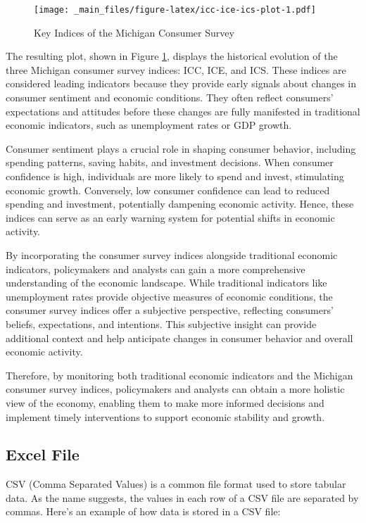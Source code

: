 \documentclass[
]{book}
\begin{document}
\begin{figure}
\centering
\texttt{[image: \_main\_files/figure-latex/icc-ice-ics-plot-1.pdf]}
\caption{\label{fig:icc-ice-ics-plot}Key Indices of the Michigan Consumer Survey}
\end{figure}

The resulting plot, shown in Figure \ref{fig:icc-ice-ics-plot}, displays the historical evolution of the three Michigan consumer survey indices: ICC, ICE, and ICS. These indices are considered leading indicators because they provide early signals about changes in consumer sentiment and economic conditions. They often reflect consumers' expectations and attitudes before these changes are fully manifested in traditional economic indicators, such as unemployment rates or GDP growth.

Consumer sentiment plays a crucial role in shaping consumer behavior, including spending patterns, saving habits, and investment decisions. When consumer confidence is high, individuals are more likely to spend and invest, stimulating economic growth. Conversely, low consumer confidence can lead to reduced spending and investment, potentially dampening economic activity. Hence, these indices can serve as an early warning system for potential shifts in economic activity.

By incorporating the consumer survey indices alongside traditional economic indicators, policymakers and analysts can gain a more comprehensive understanding of the economic landscape. While traditional indicators like unemployment rates provide objective measures of economic conditions, the consumer survey indices offer a subjective perspective, reflecting consumers' beliefs, expectations, and intentions. This subjective insight can provide additional context and help anticipate changes in consumer behavior and overall economic activity.

Therefore, by monitoring both traditional economic indicators and the Michigan consumer survey indices, policymakers and analysts can obtain a more holistic view of the economy, enabling them to make more informed decisions and implement timely interventions to support economic stability and growth.

\hypertarget{excel-file}{%
\subsection{Excel File}\label{excel-file}}

CSV (Comma Separated Values) is a common file format used to store tabular data. As the name suggests, the values in each row of a CSV file are separated by commas. Here's an example of how data is stored in a CSV file:
\end{document}
